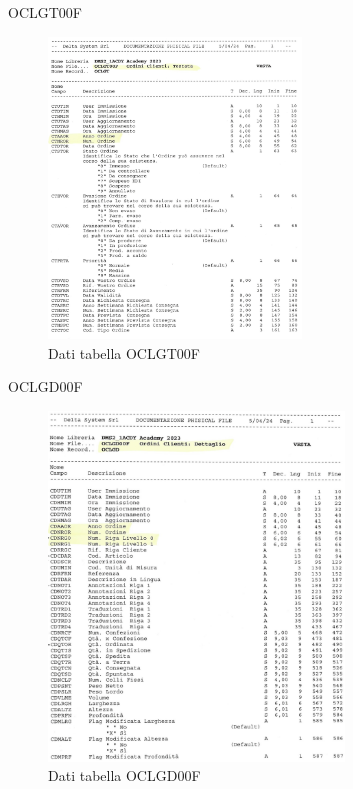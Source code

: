 \documentclass[target=bach,aauheader=,style=]{thud}
\begin{document}
OCLGT00F 
\begin{figure}[H]
    \begin{center}
        \includegraphics[width=0.6\textwidth, angle=90]{database/oclgt00f.jpg}
    \end{center}
    \caption{Dati tabella OCLGT00F}
\end{figure}

\newpage
OCLGD00F
\begin{figure}[H]
    \begin{center}
        \includegraphics[width=0.7\textwidth]{database/oclgd00f.jpg}
    \end{center}
    \caption{Dati tabella OCLGD00F}
\end{figure}
\end{document}
